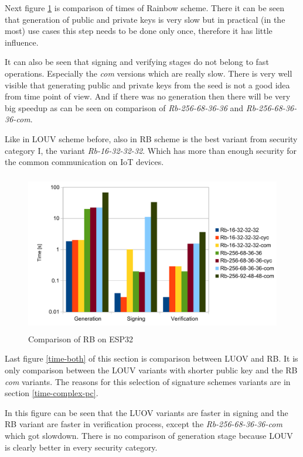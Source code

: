 \documentclass[thesis=M,english]{FITthesis}[2019/12/23]
\begin{document}
Next figure \ref{time-rb} is comparison of times of Rainbow scheme. There it can be seen that generation of public and private keys is very slow but in practical (in the most) use cases this step needs to be done only once, therefore it has little influence.

\bigskip
\noindent
It can also be seen that signing and verifying stages do not belong to fast operations. Especially the \textit{com} versions which are really slow. There is very well visible that generating public and private keys from the seed is not a good idea from time point of view. And if there was no generation then there will be very big speedup as can be seen on comparison of \textit{Rb-256-68-36-36} and \textit{Rb-256-68-36-36-com}.

\bigskip
\noindent
Like in LOUV scheme before, also in RB scheme is the best variant from security category I, the variant \textit{Rb-16-32-32-32}. Which has more than enough security for the common communication on IoT devices.

\begin{figure}[H]
\centering
\includegraphics[width=13cm,height=7cm]{images/time-rb.pdf}
\caption{Comparison of RB on ESP32}
\label{time-rb}
\end{figure}

\noindent
Last figure \ref{time-both} of this section is comparison between LUOV and RB. It is only comparison between the LOUV variants with shorter public key and the RB \textit{com} variants. The reasons for this selection of signature schemes variants are in section \ref{time-complex-pc}.

\bigskip
\noindent
In this figure can be seen that the LUOV variants are faster in signing and the RB variant are faster in verification process, except the \textit{Rb-256-68-36-36-com} which got slowdown. There is no comparison of generation stage because LOUV is clearly better in every security category.
\end{document}
